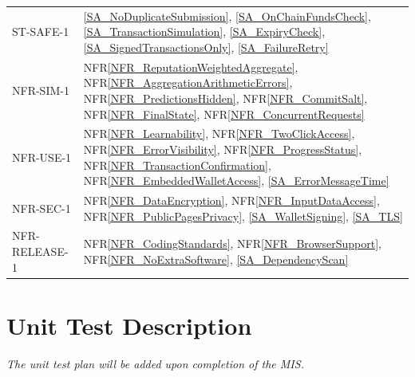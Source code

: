 \documentclass[12pt]{article}
\newcommand{\nfrref}[1]{NFR\ref{#1}}
\newcommand{\saref}[1]{\ref{#1}}
\begin{document}
\begin{longtable}{p{} p{}}
ST-SAFE-1 & \saref{SA_NoDuplicateSubmission}, \saref{SA_OnChainFundsCheck}, \saref{SA_TransactionSimulation}, \saref{SA_ExpiryCheck}, \saref{SA_SignedTransactionsOnly}, \saref{SA_FailureRetry}\\
NFR-SIM-1 & \nfrref{NFR_ReputationWeightedAggregate}, \nfrref{NFR_AggregationArithmeticErrors}, \nfrref{NFR_PredictionsHidden}, \nfrref{NFR_CommitSalt}, \nfrref{NFR_FinalState}, \nfrref{NFR_ConcurrentRequests}\\
NFR-USE-1 & \nfrref{NFR_Learnability}, \nfrref{NFR_TwoClickAccess}, \nfrref{NFR_ErrorVisibility}, \nfrref{NFR_ProgressStatus}, \nfrref{NFR_TransactionConfirmation}, \nfrref{NFR_EmbeddedWalletAccess}, \saref{SA_ErrorMessageTime}\\
NFR-SEC-1 & \nfrref{NFR_DataEncryption}, \nfrref{NFR_InputDataAccess}, \nfrref{NFR_PublicPagesPrivacy}, \saref{SA_WalletSigning}, \saref{SA_TLS}\\
NFR-RELEASE-1 & \nfrref{NFR_CodingStandards}, \nfrref{NFR_BrowserSupport}, \nfrref{NFR_NoExtraSoftware}, \saref{SA_DependencyScan}\\
\bottomrule
\end{longtable}

\section{Unit Test Description}

\textit{The unit test plan will be added upon completion of the MIS.}
\end{document}
